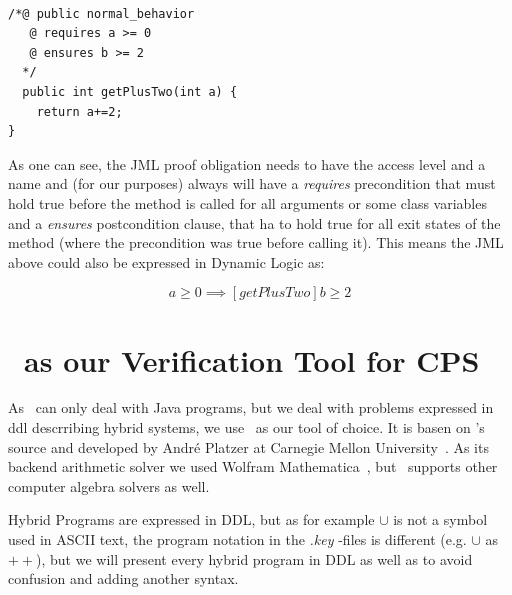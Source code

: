 \begin{lstlisting}[label=lst:jml_example]

/*@ public normal_behavior
   @ requires a >= 0
   @ ensures b >= 2
  */
  public int getPlusTwo(int a) {
  	return a+=2;
}

\end{lstlisting}

As one can see, the JML proof obligation needs to have the access level and a name and (for our purposes) always will have a \textit{requires} precondition that must hold true before the method is called for all arguments or some class variables and a \textit{ensures} postcondition clause, that ha to hold true for all exit states of the method (where the precondition was true before calling it). This means the JML above could also be expressed in Dynamic Logic as:

\begin{equation}
	a \geq 0 \implies [getPlusTwo] b \geq 2
	\label{eq:jmlddl}
\end{equation}

\section{\keym~as our Verification Tool for CPS}
\label{sec:pre:key}

As \key~can only deal with Java programs, but we deal with problems expressed in ddl descrribing hybrid systems, we use \keym~as our tool of choice. It is basen on \key's source and developed by Andr\'e Platzer at Carnegie Mellon University~\cite{keymaera}. As its backend arithmetic solver we used Wolfram Mathematica~\cite{mathematica}, but \keym~supports other computer algebra solvers as well.

Hybrid Programs are expressed in DDL, but as for example \(\cup\) is not a symbol used in ASCII text, the program notation in the \textit{.key} \keym-files is different (e.g. \(\cup\) as \(++\)), but we will present every hybrid program in DDL as well as to avoid confusion and adding another syntax.

